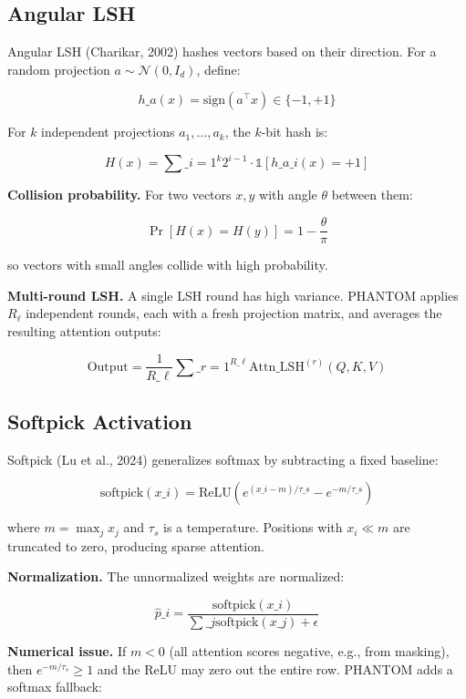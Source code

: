 \subsection{Angular LSH}

Angular LSH (Charikar, 2002) hashes vectors based on their direction. For a 
random projection $a \sim \mathcal{N}(0, I_d)$, define:

\[
h\_a(x) = \text{sign}(a^\top x) \in \{-1, +1\}
\tag{3.5}
\]

For $k$ independent projections $a_1, \dots, a_k$, the $k$-bit hash is:

\[
H(x) = \sum\_{i=1}^{k} 2^{i-1} \cdot \mathbb{1}[h\_{a\_i}(x) = +1]
\tag{3.6}
\]

\textbf{Collision probability.} For two vectors $x, y$ with angle $\theta$ between 
them:

\[
\Pr[H(x) = H(y)] = 1 - \frac{\theta}{\pi}
\tag{3.7}
\]

so vectors with small angles collide with high probability.

\textbf{Multi-round LSH.} A single LSH round has high variance. PHANTOM applies 
$R_\ell$ independent rounds, each with a fresh projection matrix, and 
averages the resulting attention outputs:

\[
\text{Output} = \frac{1}{R\_\ell} \sum\_{r=1}^{R\_\ell} \text{Attn}\_{\text{LSH}}^{(r)}(Q, K, V)
\tag{3.8}
\]

\subsection{Softpick Activation}

Softpick (Lu et al., 2024) generalizes softmax by subtracting a fixed baseline:

\[
\text{softpick}(x\_i) = \text{ReLU}\!\left(e^{(x\_i - m)/\tau\_s} - e^{-m/\tau\_s}\right)
\tag{3.9}
\]

where $m = \max_j x_j$ and $\tau_s$ is a temperature. Positions with 
$x_i \ll m$ are truncated to zero, producing sparse attention.

\textbf{Normalization.} The unnormalized weights are normalized:

\[
\hat{p}\_i = \frac{\text{softpick}(x\_i)}{\sum\_j \text{softpick}(x\_j) + \epsilon}
\tag{3.10}
\]

\textbf{Numerical issue.} If $m < 0$ (all attention scores negative, e.g., from 
masking), then $e^{-m/\tau_s} \geq 1$ and the ReLU may zero out the entire 
row. PHANTOM adds a softmax fallback:

